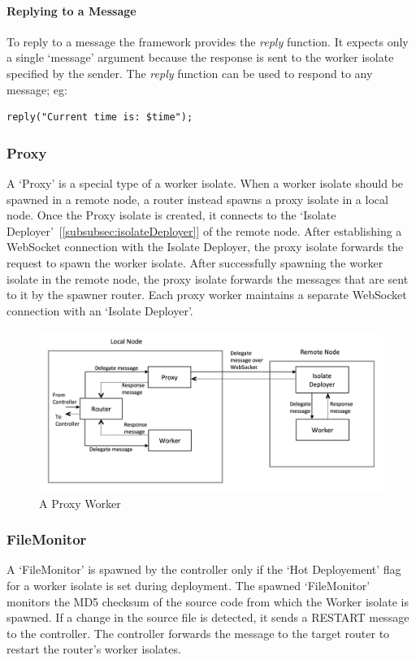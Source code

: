   \paragraph{Replying to a Message}
  \label{subsec:replyMessage}

  To reply to a message the framework provides the \emph{reply} function. It expects only a single ‘message’ argument because the response is sent to the worker isolate specified by the sender. The \emph{reply} function can be used to respond to any message; eg:
\begin{lstlisting}[numbers=none]
  reply("Current time is: $time");
\end{lstlisting}

  \subsubsection{Proxy}
  A ‘Proxy’ is a special type of a worker isolate. When a worker isolate should be spawned in a remote node, a router instead spawns a proxy isolate in a local node. Once the Proxy isolate is created, it connects to the ‘Isolate Deployer’~[\autoref{subsubsec:isolateDeployer}] of the remote node. After establishing a WebSocket connection with the Isolate Deployer, the proxy isolate forwards the request to spawn the worker isolate. After successfully spawning the worker isolate in the remote node, the proxy isolate forwards the messages that are sent to it by the spawner router. Each proxy worker maintains a separate WebSocket connection with an ‘Isolate Deployer’.\\

  \begin{figure}[H]
    \centering
    \includegraphics[width=1\textwidth]{figures/proxy}
    \caption[Proxy Worker]{A Proxy Worker}
    \label{fig:proxy}
  \end{figure}

  \subsubsection{FileMonitor}
  \label{subsubsec:fileMonitor}
  A ‘FileMonitor’ is spawned by the controller only if the ‘Hot Deployement’ flag for a worker isolate is set during deployment. The spawned ‘FileMonitor’ monitors the MD5 checksum of the source code from which the Worker isolate is spawned. If a change in the source file is detected, it sends a RESTART message to the controller. The controller forwards the message to the target router to restart the router's worker isolates.


